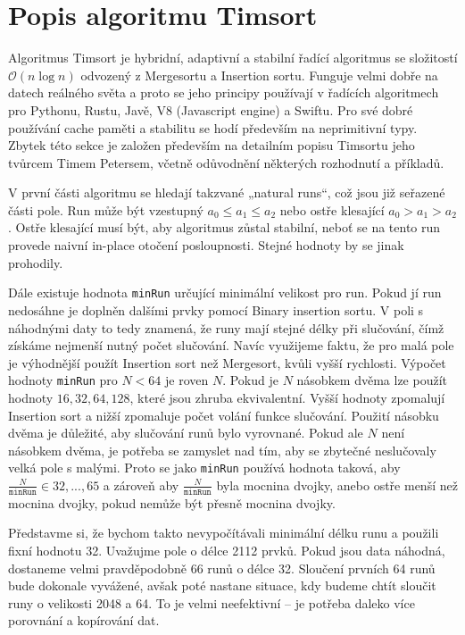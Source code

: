\documentclass[thesis=B,czech]{FITthesis}[2019/12/23]
\begin{document}
\section{Popis algoritmu Timsort}
Algoritmus Timsort je hybridní, adaptivní a stabilní řadící algoritmus se složitostí $ \mathcal{O}(n \log{n}) $ odvozený z Mergesortu a Insertion sortu.\cite{timexplain5} Funguje velmi dobře na datech reálného světa a proto se jeho principy používají v řadících algoritmech pro Pythonu\cite{pythonimpl}, Rustu\cite{rustimpl}, Javě\cite{javaimpl}, V8 (Javascript engine)\cite{v8impl} a Swiftu\cite{swiftimpl}. Pro své dobré používání cache paměti a stabilitu se hodí především na neprimitivní typy\cite{timexplain4}. Zbytek této sekce je založen především na detailním popisu Timsortu jeho tvůrcem Timem Petersem, včetně odůvodnění některých rozhodnutí a příkladů.\cite{timexplain1,timexplain2,timexplain3,timexplain6}

V první části algoritmu se hledají takzvané „natural runs“, což jsou již seřazené části pole. Run může být vzestupný $ a_0 \le a_1 \le a_2 $ nebo ostře klesající $ a_0 > a_1 > a_2 $. Ostře klesající musí být, aby algoritmus zůstal stabilní, neboť se na tento run provede naivní in-place otočení posloupnosti. Stejné hodnoty by se jinak prohodily. 

Dále existuje hodnota \texttt{minRun} určující minimální velikost pro run. Pokud jí run nedosáhne je doplněn dalšími prvky pomocí Binary insertion sortu. V poli s náhodnými daty to tedy znamená, že runy mají stejné délky při slučování, čímž získáme nejmenší nutný počet slučování. 
Navíc využijeme faktu, že pro malá pole je výhodnější použít Insertion sort než Mergesort, kvůli vyšší rychlosti.
Výpočet hodnoty \texttt{minRun} pro $ N < 64 $ je roven $ N $. Pokud je $ N $ násobkem dvěma lze použít hodnoty $ 16,32,64,128 $, které jsou zhruba ekvivalentní. Vyšší hodnoty zpomalují Insertion sort a nižší zpomaluje počet volání funkce slučování. Použití násobku dvěma je důležité, aby slučování runů bylo vyrovnané. Pokud ale $ N $ není násobkem dvěma, je potřeba se zamyslet nad tím, aby se zbytečné neslučovaly velká pole s malými. Proto se jako \texttt{minRun} používá hodnota taková, aby $ \frac{N}{\texttt{minRun}} \in {32,...,65} $ a zároveň aby $ \frac{N}{\texttt{minRun}} $ byla mocnina dvojky, anebo ostře menší než mocnina dvojky, pokud nemůže být přesně mocnina dvojky.

Představme si, že bychom takto nevypočítávali minimální délku runu a použili fixní hodnotu 32. Uvažujme pole o délce 2112 prvků. Pokud jsou data náhodná, dostaneme velmi pravděpodobně 66 runů o délce 32. Sloučení prvních 64 runů bude dokonale vyvážené, avšak poté nastane situace, kdy budeme chtít sloučit runy o velikosti 2048 a 64. To je velmi neefektivní -- je potřeba daleko více porovnání a kopírování dat.
\end{document}
